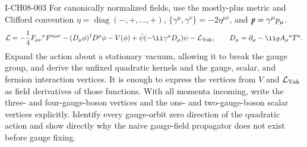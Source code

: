 \begin{exercise}{I-CH08-003}
For canonically normalized fields, use
the mostly-plus metric and Clifford convention
$\eta=\operatorname{diag}(-,+,\ldots,+)$,
$\{\gamma^\mu,\gamma^\nu\}=-2\eta^{\mu\nu}$, and
$\slashed p=\gamma^\mu p_\mu$.
\[
 \mathcal L=-\frac14F_{\mu\nu}{}^aF^{a\mu\nu}
 -(D_\mu\phi)^\dagger D^\mu\phi-V(\phi)
 +\bar\psi(-\ii\gamma^\mu D_\mu)\psi-\mathcal L_{\rm Yuk},
 \qquad D_\mu=\partial_\mu-\ii gA_\mu{}^aT^a.
\]
Expand the action about a stationary vacuum, allowing it to break the gauge
group, and derive the unfixed quadratic kernels and the gauge, scalar, and
fermion interaction vertices.
It is enough to express the vertices from $V$ and $\mathcal L_{\rm Yuk}$ as
field derivatives of those functions.  With all momenta incoming, write the
three- and four-gauge-boson vertices and the one- and two-gauge-boson scalar
vertices explicitly.  Identify every gauge-orbit zero direction of the
quadratic action and show directly why the naive gauge-field propagator does
not exist before gauge fixing.
\end{exercise}
